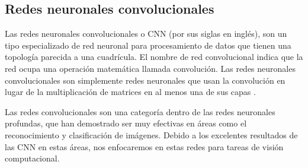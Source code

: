 


\subsection{Redes neuronales convolucionales}

\begin{remark}
Las redes neuronales convolucionales o CNN (por sus siglas en inglés), son un tipo especializado
de red neuronal para procesamiento de datos que tienen una topología parecida a una cuadrícula. El nombre de 
red convolucional indica que la red ocupa una operación matemática llamada convolución. Las redes 
neuronales
convolucionales son simplemente redes neuronales que usan la convolución en lugar de la multiplicación de 
matrices en al menos una de sus capas \cite{iangoodfellowyoshuabengioaaroncourville2017}.
\end{remark}


Las redes convolucionales son una categoría dentro de las redes neuronales profundas, que han 
demostrado ser muy efectivas en áreas como el reconocimiento y clasificación de imágenes. Debido
a los excelentes resultados de las CNN en estas áreas, nos enfocaremos en estas redes para tareas
de visión computacional.\\

